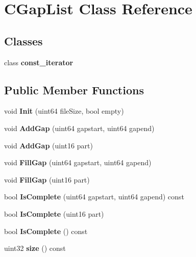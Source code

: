 \section{CGapList Class Reference}
\label{classCGapList}
\subsection*{Classes}
\begin{DoxyCompactItemize}
\item 
class {\bf const\_\-iterator}
\end{DoxyCompactItemize}
\subsection*{Public Member Functions}
\begin{DoxyCompactItemize}
\item 
void {\bfseries Init} (uint64 fileSize, bool empty)\label{classCGapList_ad6c7c4767c64e4de2df1181236fcb81b}

\item 
void {\bfseries AddGap} (uint64 gapstart, uint64 gapend)\label{classCGapList_a45d44037b47455a71c0e160925b2e645}

\item 
void {\bfseries AddGap} (uint16 part)\label{classCGapList_aa33f71e8bb31acd5c50d70a0613f0ed4}

\item 
void {\bfseries FillGap} (uint64 gapstart, uint64 gapend)\label{classCGapList_a1a6bdd4c618659ea7c81a1296d61a54e}

\item 
void {\bfseries FillGap} (uint16 part)\label{classCGapList_a2a702e46400f2335a89c71a0a2e4fc78}

\item 
bool {\bfseries IsComplete} (uint64 gapstart, uint64 gapend) const \label{classCGapList_a30259be6ca3102a5cd474c5e91fcb52c}

\item 
bool {\bfseries IsComplete} (uint16 part)\label{classCGapList_a42543bad12b54b408164c9fb61faf035}

\item 
bool {\bfseries IsComplete} () const \label{classCGapList_ae0fdcfbde483feba4e700c2ac0e7e3e2}

\item 
uint32 {\bfseries size} () const \label{classCGapList_ab0fd731900dac1923ab4c0526d3f9d6c}


\end{DoxyCompactItemize}
